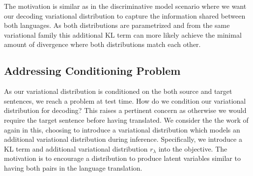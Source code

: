 The motivation is similar as in the discriminative model scenario where we want our decoding variational distribution to capture the information shared between both languages. As both distributions are parametrized and from the same variational family this additional KL term can more likely achieve the minimal amount of divergence where both distributions match each other. 

\subsection{Addressing Conditioning Problem}

As our variational distribution is conditioned on the both source and target sentences, we reach a problem at test time. How do we condition our variational distribution for decoding? This raises a pertinent concern as otherwise we would require the target sentence before having translated. We consider the the work of \cite{eikema2018AEVNMT} again in this, choosing to introduce a variational distribution which models an additional variational distribution during inference. Specifically, we introduce a KL term and additional variational distribution $r_{\lambda}$ into the objective. The motivation is to encourage a distribution to produce latent variables similar to having both pairs in the language translation. 








